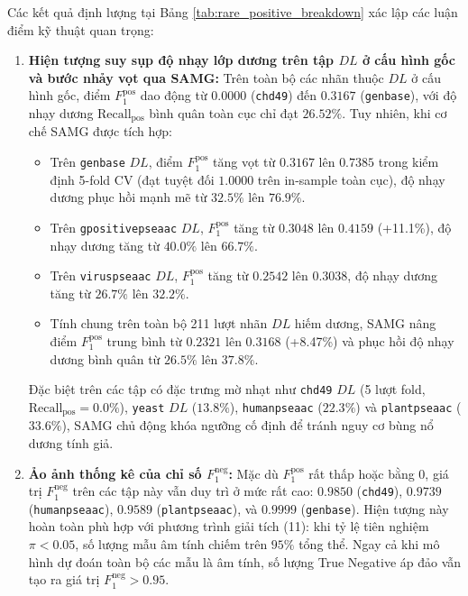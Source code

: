 \documentclass[10pt,a4paper]{article}
\begin{document}
Các kết quả định lượng tại Bảng \ref{tab:rare_positive_breakdown} xác lập các luận điểm kỹ thuật quan trọng:
\begin{enumerate}[leftmargin=*]
    \item \textbf{Hiện tượng suy sụp độ nhạy lớp dương trên tập $DL$ ở cấu hình gốc và bước nhảy vọt qua SAMG:} 
    Trên toàn bộ các nhãn thuộc $DL$ ở cấu hình gốc, điểm $F_1^{\text{pos}}$ dao động từ $0.0000$ (\texttt{chd49}) đến $0.3167$ (\texttt{genbase}), với độ nhạy dương $\text{Recall}_{\text{pos}}$ bình quân toàn cục chỉ đạt $26.52\%$. Tuy nhiên, khi cơ chế SAMG được tích hợp:
    \begin{itemize}
        \item Trên \texttt{genbase} $DL$, điểm $F_1^{\text{pos}}$ tăng vọt từ $0.3167$ lên \textbf{$0.7385$} trong kiểm định 5-fold CV (đạt tuyệt đối \textbf{$1.0000$} trên in-sample toàn cục), độ nhạy dương phục hồi mạnh mẽ từ $32.5\%$ lên \textbf{$76.9\%$}.
        \item Trên \texttt{gpositivepseaac} $DL$, $F_1^{\text{pos}}$ tăng từ $0.3048$ lên \textbf{$0.4159$} (+11.1\%), độ nhạy dương tăng từ $40.0\%$ lên \textbf{$66.7\%$}.
        \item Trên \texttt{viruspseaac} $DL$, $F_1^{\text{pos}}$ tăng từ $0.2542$ lên \textbf{$0.3038$}, độ nhạy dương tăng từ $26.7\%$ lên \textbf{$32.2\%$}.
        \item Tính chung trên toàn bộ 211 lượt nhãn $DL$ hiếm dương, SAMG nâng điểm $F_1^{\text{pos}}$ trung bình từ $0.2321$ lên \textbf{$0.3168$} (+8.47\%) và phục hồi độ nhạy dương bình quân từ $26.5\%$ lên \textbf{$37.8\%$}.
    \end{itemize}
    Đặc biệt trên các tập có đặc trưng mờ nhạt như \texttt{chd49} $DL$ (5 lượt fold, $\text{Recall}_{\text{pos}} = 0.0\%$), \texttt{yeast} $DL$ ($13.8\%$), \texttt{humanpseaac} ($22.3\%$) và \texttt{plantpseaac} ($33.6\%$), SAMG chủ động khóa ngưỡng cố định để tránh nguy cơ bùng nổ dương tính giả.
    \item \textbf{Ảo ảnh thống kê của chỉ số $F_1^{\text{neg}}$:} 
    Mặc dù $F_1^{\text{pos}}$ rất thấp hoặc bằng 0, giá trị $F_1^{\text{neg}}$ trên các tập này vẫn duy trì ở mức rất cao: $0.9850$ (\texttt{chd49}), $0.9739$ (\texttt{humanpseaac}), $0.9589$ (\texttt{plantpseaac}), và $0.9999$ (\texttt{genbase}). Hiện tượng này hoàn toàn phù hợp với phương trình giải tích (11): khi tỷ lệ tiên nghiệm $\pi < 0.05$, số lượng mẫu âm tính chiếm trên $95\%$ tổng thể. Ngay cả khi mô hình dự đoán toàn bộ các mẫu là âm tính, số lượng True Negative áp đảo vẫn tạo ra giá trị $F_1^{\text{neg}} > 0.95$.

\end{enumerate}
\end{document}
